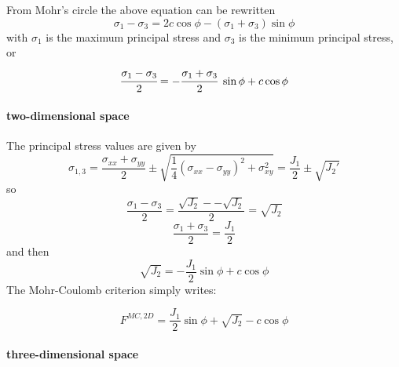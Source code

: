 From Mohr's circle the above equation can be rewritten
\[
\sigma_1-\sigma_3 = 2 c \cos \phi - (\sigma_1+\sigma_3) \sin\phi
\]
with $\sigma_1$ is the maximum principal stress and $\sigma_3$ is the minimum principal stress, or
\[
\cfrac{\sigma_1-\sigma_3}{2} = -\cfrac{\sigma_1+\sigma_3}{2}~\sin\phi + c\cos\phi 
\]

\paragraph{two-dimensional space}

The principal stress values are given by
\[
\sigma_{1,3} = \frac{\sigma_{xx}+\sigma_{yy}}{2} \pm \sqrt{ \frac{1}{4}(\sigma_{xx}-\sigma_{yy})^2 + \sigma_{xy}^2  }
= \frac{J_1}{2} \pm \sqrt{ J_2'}
\]
so
\[
\frac{\sigma_1-\sigma_3}{2} = \frac{\sqrt{J_2}- - \sqrt{J_2}}{2} = \sqrt{J_2}
\]
\[
\frac{\sigma_1+\sigma_3}{2} =  \frac{J_1}{2} 
\]
and then
\[
\sqrt{J_2} = - \frac{J_1}{2} \sin\phi + c\cos\phi 
\]
The Mohr-Coulomb criterion simply writes:

\begin{mdframed}[backgroundcolor=blue!5]
\begin{equation}
F^{MC,2D}=  \frac{J_1}{2} \sin \phi + \sqrt{J_2} - c  \cos \phi  \label{mc2Dcriterion}
\end{equation}
\end{mdframed}

\paragraph{three-dimensional space}



